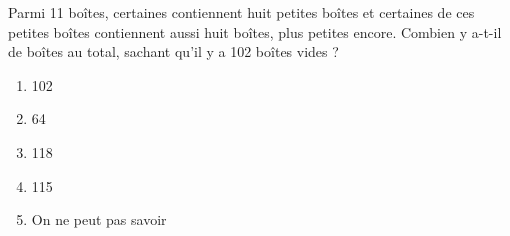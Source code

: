 Parmi 11 boîtes, certaines contiennent huit petites boîtes et certaines de ces petites boîtes contiennent aussi huit boîtes, plus petites encore. Combien y a-t-il de boîtes au total, sachant qu'il y a 102 boîtes vides ?
\begin{multicols}{5}
  \begin{enumerate}[A/]
  \item 102
  \item 64
  \item 118
  \item 115
  \item On ne peut pas savoir
  \end{enumerate}
\end{multicols}